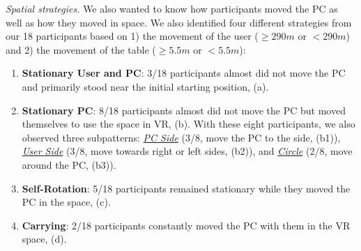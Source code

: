 \vspace{1mm}\noindent\textit{Spatial strategies.}
We also wanted to know how participants moved the PC as well as how they moved in space.
We also identified four different strategies from our 18 participants based on 1) the movement of the user (${\geq} 290m$ or ${<} 290m$) and 2) the movement of the table (${\geq} 5.5m$ or ${<} 5.5m$):
\begin{enumerate}[noitemsep,topsep=0pt,parsep=0pt,partopsep=0pt,leftmargin=*]
    \item \textbf{Stationary User and PC}: 3/18 participants almost did not move the PC and primarily stood near the initial starting position, (a).
    \item \textbf{Stationary PC}: 8/18 participants almost did not move the PC but moved themselves to use the space in VR, (b). With these eight participants, we also observed three subpatterns: \textit{\underline{PC Side}} (3/8, move the PC to the side, (b1)),  \textit{\underline{User Side}} (3/8, move towards right or left sides, (b2)), and \textit{\underline{Circle}} (2/8, move around the PC, (b3)).
    \item \textbf{Self-Rotation}: 5/18 participants remained stationary while they moved the PC in the space, (c).
    \item \textbf{Carrying}: 2/18 participants constantly moved the PC with them in the VR space, (d).
\end{enumerate}
